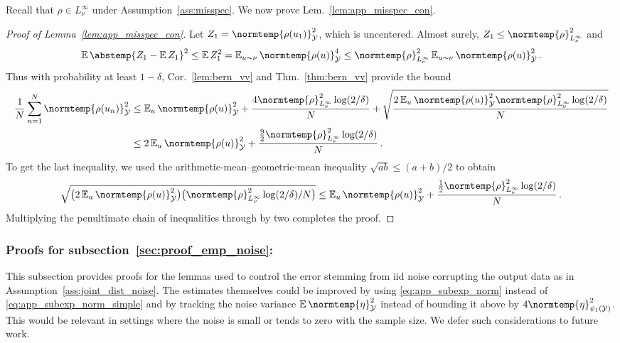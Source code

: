 \documentclass{article}
\theoremstyle{plain}
\theoremstyle{my_def}
\theoremstyle{my_rem}
\numberwithin{equation}{section}
\numberwithin{theorem}{section}%
\newcommand{\E}{\mathbb{E}}
\newcommand{\cY}{\mathcal{Y}}
\newcommand{\norm}{\normtemp}
\newcommand{\abs}{\abstemp}
\renewcommand{\E}{\operatorname{\mathbb{E}}} %
\begin{document}
Recall that $\rho\in L^\infty_\nu$ under Assumption~\ref{ass:misspec}. We now prove Lem.~\ref{lem:app_misspec_con}.
\begin{proof}[Proof of Lemma~\ref{lem:app_misspec_con}]
    Let $Z_1=\norm{\rho(u_1)}_{\cY}^2$, which is uncentered. Almost surely, $Z_1\leq \norm{\rho}_{L^\infty_\nu}^2$ and
    \begin{equation*}
            \E\abs{Z_1-\E Z_1}^2\leq \E Z_1^2=\E_{u\sim\nu}\norm{\rho(u)}_{\cY}^4\leq \norm{\rho}_{L^\infty_\nu}^2\E_{u\sim\nu}\norm{\rho(u)}_{\cY}^2\,.
    \end{equation*}
    Thus with probability at least $1-\delta$, Cor.~\ref{lem:bern_vv} and Thm.~\ref{thm:bern_vv} provide the bound
    \begin{align*}
        \frac1N\sum_{n=1}^N\norm{\rho(u_n)}_{\cY}^2&\leq \E_u \norm{\rho(u)}_{\cY}^2 + \frac{4\norm{\rho}_{L^\infty_\nu}^2\log(2/\delta)}{N} + \sqrt{\frac{2\E_u \norm{\rho(u)}_{\cY}^2 \norm{\rho}_{L^\infty_\nu}^2\log(2/\delta)}{N}}\\
        &\leq 2\E_u \norm{\rho(u)}_{\cY}^2 + \frac{\frac{9}{2}\norm{\rho}_{L^\infty_\nu}^2\log(2/\delta)}{N}\,.
    \end{align*}
    To get the last inequality, we used the arithmetic-mean--geometric-mean inequality $\sqrt{ab} \le (a + b)/2$ to obtain
    \begin{equation*}
        \sqrt{\bigl(2\E_u \norm{\rho(u)}_{\cY}^2\bigr)\bigl(\norm{\rho}_{L^\infty_\nu}^2\log(2/\delta)/N\bigr)}
        \le
        \E_u \norm{\rho(u)}_{\cY}^2 + \frac{\frac{1}{2}\norm{\rho}_{L^\infty_\nu}^2\log(2/\delta)}{N}\,.
    \end{equation*}
    Multiplying the penultimate chain of inequalities through by two completes the proof.
\end{proof}

\subsubsection{Proofs for subsection~\ref{sec:proof_emp_noise}:~}\label{app:proof_proof_emp_noise}

This subsection provides proofs for the lemmas used to control the error stemming from iid noise corrupting the output data as in Assumption~\ref{ass:joint_dist_noise}. The estimates themselves could be improved by using \eqref{eq:app_subexp_norm} instead of \eqref{eq:app_subexp_norm_simple} and by tracking the noise variance $\E\norm{\eta}^2_\cY$ instead of bounding it above by $4\norm{\eta}_{\psi_1(\cY)}^2$. This would be relevant in settings where the noise is small or tends to zero with the sample size. We defer such considerations to future work.
\end{document}

